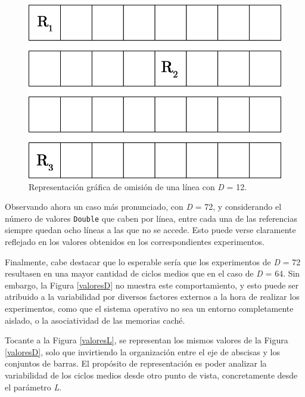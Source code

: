 \documentclass[conference]{IEEEtran}
\begin{document}
\begin{figure}[htbp]
\centerline{\includegraphics[scale=0.18]{ejemploCache.png}}
\caption{Representación gráfica de omisión de una línea con \textit{D} = 12.}
\label{ejemploCache}
\end{figure}

Observando ahora un caso más pronunciado, con \textit{D} = 72, y considerando el número de valores \texttt{Double} que caben por línea, entre cada una de las referencias siempre quedan ocho líneas a las que no se accede. Esto puede verse claramente reflejado en los valores obtenidos en los correspondientes experimentos.

Finalmente, cabe destacar que lo esperable sería que los experimentos de \textit{D} = 72 resultasen en una mayor cantidad de ciclos medios que en el caso de \textit{D} = 64. Sin embargo, la Figura \ref{valoresD} no muestra este comportamiento, y esto puede ser atribuido a la variabilidad por diversos factores externos a la hora de realizar los experimentos, como que el sistema operativo no sea un entorno completamente aislado, o la asociatividad de las memorias caché.

Tocante a la Figura \ref{valoresL}, se representan los mismos valores de la Figura \ref{valoresD}, solo que invirtiendo la organización entre el eje de abscisas y los conjuntos de barras. El propósito de representación es poder analizar la variabilidad de los ciclos medios desde otro punto de vista, concretamente desde el parámetro \textit{L}.
\end{document}

